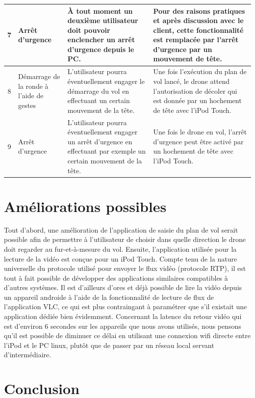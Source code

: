 \documentclass{article}
\begin{document}
\begin{center}
\begin{tabularx}{15cm}{|c|p{3cm}|p{5cm}||X|}
            \hline
            7 & Arrêt d'urgence  & À tout moment un deuxième utilisateur doit pouvoir enclencher un arrêt d'urgence depuis le PC. & Pour des raisons pratiques et après discussion avec le client, cette fonctionnalité est remplacée par l'arrêt d'urgence par un mouvement de tête.\\
            \hline
            8 & Démarrage de la ronde à l'aide de gestes & L'utilisateur pourra éventuellement engager le démarrage du vol en effectuant un certain mouvement de la tête. & Une fois l'exécution du plan de vol lancé, le drone attend l'autorisation de décoler qui est donnée par un hochement de tête avec l'iPod Touch.	\\
			\hline
			9 & Arrêt d'urgence & L'utilisateur pourra éventuellement engager un arrêt d'urgence en effectuant par exemple un certain mouvement de la tête. & Une fois le drone en vol, l'arrêt d'urgence peut être activé par un hochement de tête avec l'iPod Touch.	\\
			\hline
        \end{tabularx}
        \end{center}
	
\newpage
\section{Améliorations possibles}
Tout d'abord, une amélioration de l'application de saisie du plan de vol serait possible afin de permettre à l'utilisateur de choisir dans quelle direction le drone doit regarder au fur-et-à-mesure du vol.
\medbreak
Ensuite, l'application utilisée pour la lecture de la vidéo est conçue pour un iPod Touch. Compte tenu de la nature universelle du protocole utilisé pour envoyer le flux vidéo (protocole RTP), il est tout à fait possible de développer des applications similaires compatibles à d'autres systèmes. Il est d'ailleurs d'ores et déjà possible de lire la vidéo depuis un appareil androide à l'aide de la fonctionnalité de lecture de flux de l'application VLC, ce qui est plus contraingant à paramétrer que s'il existait une application dédiée bien évidemment.
\medbreak
Concernant la latence du retour vidéo qui est d'environ 6 secondes sur les appareils que nous avons utilisés, nous pensons qu'il est possible de diminuer ce délai en utilisant une connexion wifi directe entre l'iPod et le PC linux, plutôt que de passer par un réseau local servant d'intermédiaire.

\section{Conclusion}
\end{document}

